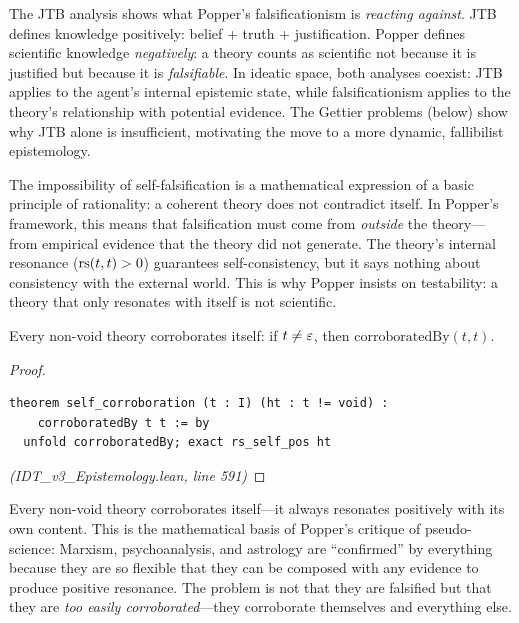 \begin{remark}
The JTB analysis shows what Popper's falsificationism is \emph{reacting against}.
JTB defines knowledge positively: belief + truth + justification. Popper defines
scientific knowledge \emph{negatively}: a theory counts as scientific not because
it is justified but because it is \emph{falsifiable}. In ideatic space, both
analyses coexist: JTB applies to the agent's internal epistemic state, while
falsificationism applies to the theory's relationship with potential evidence.
The Gettier problems (below) show why JTB alone is insufficient, motivating
the move to a more dynamic, fallibilist epistemology.
\end{remark}


\begin{interpretation}
The impossibility of self-falsification is a mathematical expression of a basic
principle of rationality: a coherent theory does not contradict itself. In
Popper's framework, this means that falsification must come from \emph{outside}
the theory---from empirical evidence that the theory did not generate. The
theory's internal resonance ($\mathrm{rs}(t,t) > 0$) guarantees self-consistency, but
it says nothing about consistency with the external world. This is why Popper
insists on testability: a theory that only resonates with itself is not
scientific.
\end{interpretation}

\begin{theorem}
\label{thm:self-corroboration}
Every non-void theory corroborates itself: if $t \neq \varepsilon$, then
$\mathrm{corroboratedBy}(t, t)$.
\end{theorem}

\begin{proof}
\begin{lstlisting}
theorem self_corroboration (t : I) (ht : t != void) :
    corroboratedBy t t := by
  unfold corroboratedBy; exact rs_self_pos ht
\end{lstlisting}
\textit{(IDT\_v3\_Epistemology.lean, line 591)}
\end{proof}

\begin{interpretation}
Every non-void theory corroborates itself---it always resonates positively with
its own content. This is the mathematical basis of Popper's critique of
pseudo-science: Marxism, psychoanalysis, and astrology are ``confirmed'' by
everything because they are so flexible that they can be composed with any
evidence to produce positive resonance. The problem is not that they are
falsified but that they are \emph{too easily corroborated}---they corroborate
themselves and everything else.
\end{interpretation}

